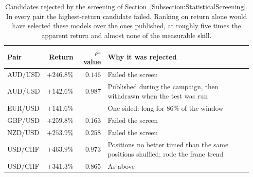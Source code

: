 \begin{table}[htb!]
\centering
\footnotesize
\begin{tabularx}{\textwidth}{@{}lrrX@{}}
\toprule
\textbf{Pair} & \textbf{Return} & \textbf{$p$-value} & \textbf{Why it was rejected} \\
\midrule
AUD/USD & $+246.8\%$ & $0.146$ & Failed the screen \\
AUD/USD & $+142.6\%$ & $0.987$ & Published during the campaign, then withdrawn when the test was run \\
EUR/USD & $+141.6\%$ & --- & One-sided: long for $86\%$ of the window \\
GBP/USD & $+259.8\%$ & $0.163$ & Failed the screen \\
NZD/USD & $+253.9\%$ & $0.258$ & Failed the screen \\
USD/CHF & $+463.9\%$ & $0.973$ & Positions no better timed than the same positions shuffled; rode the franc trend \\
USD/CHF & $+341.3\%$ & $0.865$ & As above \\
\bottomrule
\end{tabularx}
\caption{Candidates rejected by the screening of Section~\ref{Subsection:StatisticalScreening}. In every pair the highest-return candidate failed. Ranking on return alone would have selected these models over the ones published, at roughly five times the apparent return and almost none of the measurable skill.}
\label{Tables:BetaTraps}
\end{table}